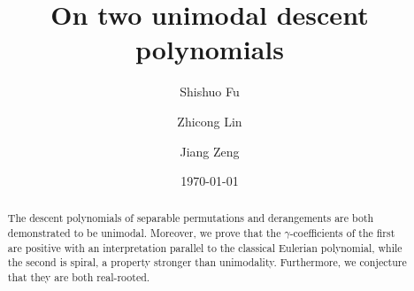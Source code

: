 \documentclass[12pt]{amsart}
\numberwithin{equation}{section}
\theoremstyle{plain}
\theoremstyle{definition}
\begin{document}
\title[Unimodal descent polynomials]{On two unimodal descent polynomials}

\author[S. Fu]{Shishuo Fu}
\address[Shishuo Fu]{College of Mathematics and Statistics, Chongqing University, Chongqing 401331, P.R. China} 




\author[Z. Lin]{Zhicong Lin}
\address[Zhicong Lin]{School of Science, Jimei University, Xiamen 361021,
P.R. China
\& CAMP, National Institute for Mathematical Sciences, Daejeon 305-811, Republic of Korea} 


\author[J. Zeng]{Jiang Zeng}

\address[Jiang Zeng]{Institut Camille Jordan,  Universit\'{e} Claude Bernard Lyon 1, France}
  
\date{\today}

\begin{abstract} 
The descent polynomials of separable permutations and derangements are 
both  demonstrated to be  
unimodal. Moreover, 
we prove that the $\gamma$-coefficients of 
the first   are positive with
an  interpretation parallel 
 to the classical Eulerian polynomial, while
the second  is spiral, a  property stronger than unimodality. 
Furthermore, we conjecture that they are both real-rooted.
\end{abstract}

\maketitle

\end{document}

